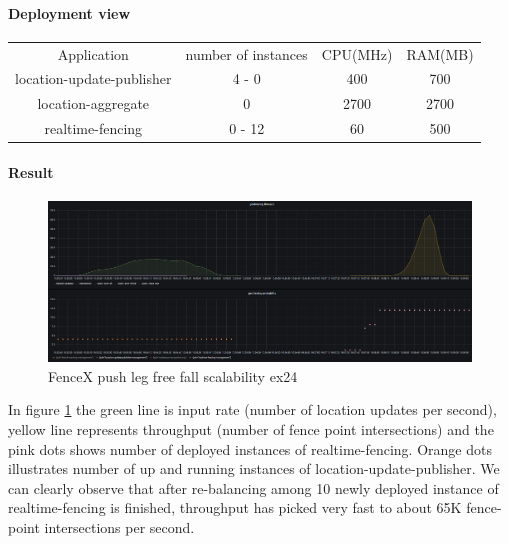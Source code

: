 \documentclass[a4]{report}
\begin{document}
        \paragraph{Deployment view}
        \begin{center}
            \begin{tabular}{ c c c c }
                Application               & number of instances & CPU(MHz) & RAM(MB) \\
                location-update-publisher & 4 - 0               & 400      & 700     \\
                location-aggregate        & 0                   & 2700     & 2700    \\
                realtime-fencing          & 0 - 12              & 60       & 500     \\
            \end{tabular}
        \end{center}

        \paragraph{Result}
        \begin{figure}[ht]
            \caption{FenceX push leg free fall scalability ex24}
            \label{fig:ex24}
            \includegraphics[scale=0.4]{images/evaluation/ex24-benchmarking-ongoing-1per2sec.png}
        \end{figure}
        In figure \ref{fig:ex24} the green line is input rate (number of location updates per second),
        yellow line represents throughput (number of fence point intersections) and the pink dots shows number of
        deployed instances of realtime-fencing.
        Orange dots illustrates number of up and running instances of location-update-publisher.
        We can clearly observe that after re-balancing among 10 newly deployed instance of realtime-fencing is finished,
        throughput has picked very fast to about 65K fence-point intersections per second.
\end{document}
